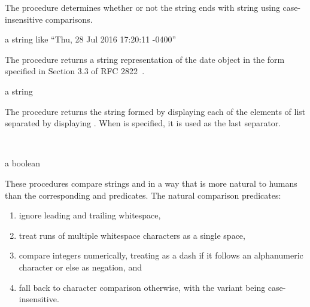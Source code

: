 The  procedure determines whether or not the
string  ends with string  using case-insensitive
comparisons.

\begin{procedure}
\end{procedure}
\returns{} a string like ``Thu, 28 Jul 2016 17:20:11 -0400''

The  procedure returns a string representation of
the date object  in the form specified in Section 3.3 of RFC
2822~\cite{RFC2822}.

\begin{procedure}
\end{procedure}
\returns{} a string

The  procedure returns the string formed by displaying each
of the elements of list  separated by displaying
. When  is specified, it is used as
the last separator.

\begin{procedure}
  \\
  \strut
\end{procedure}
\returns{} a boolean

These procedures compare strings  and  in a way that is
more natural to humans than the corresponding
 and  predicates.
The natural comparison predicates:
\begin{enumerate}
 \item ignore leading and trailing whitespace,
 \item treat runs of multiple whitespace characters as a single space,
 \item compare integers numerically, treating \code{-} as a dash
   if it follows an alphanumeric character or else as negation, and
 \item fall back to character comparison otherwise, with the 
   variant being case-insensitive.
\end{enumerate}

